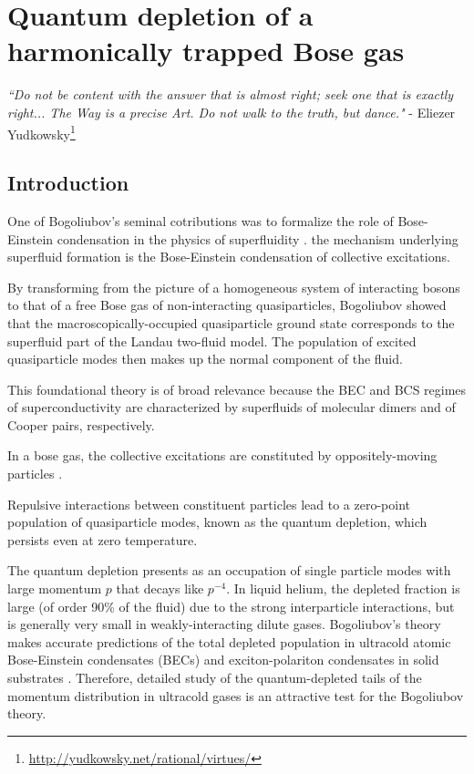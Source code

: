 \chapter{Quantum depletion of a harmonically trapped Bose gas}
\label{chap:QD}

\begin{adjustwidth}{3cm}{0cm}
\begin{flushright}
\emph{``Do not be content with the answer that is almost right; seek one that is exactly right...
	The Way is a precise Art.
	Do not walk to the truth, but dance."} - Eliezer Yudkowsky\footnote{\url{http://yudkowsky.net/rational/virtues/}}
\end{flushright}
\end{adjustwidth}


\section{Introduction} 
	One of Bogoliubov's seminal cotributions was to formalize the role of Bose-Einstein condensation in the physics of superfluidity \cite{Bogolubov47}.
	the mechanism underlying superfluid formation is the Bose-Einstein condensation of collective excitations.
	
	By transforming from the picture of a homogeneous system of interacting bosons to that of a free Bose gas of non-interacting quasiparticles, Bogoliubov showed that the macroscopically-occupied quasiparticle ground state corresponds to the superfluid part of the Landau two-fluid model.
	The population of excited quasiparticle modes then makes up the normal component of the fluid.
	
	This foundational theory is of broad relevance because the BEC and BCS regimes of superconductivity are characterized by superfluids of molecular dimers and of Cooper pairs, respectively.
	  

	In a bose gas, the collective excitations are constituted by oppositely-moving particles \cite{Vogels02}.
	
	Repulsive interactions between constituent particles lead to a zero-point population of quasiparticle modes, known as the quantum depletion, which persists even at zero temperature.
	
	The quantum depletion presents as an occupation of single particle modes with large momentum $p$ that decays like $p^{-4}$.
	In liquid helium, the depleted fraction is large (of order 90\% of the fluid) due to the strong interparticle interactions, but is generally very small in weakly-interacting dilute gases.
	Bogoliubov's theory makes accurate predictions of the total depleted population in ultracold atomic Bose-Einstein condensates (BECs) \cite{Xu06,Lopes17_depletion} and exciton-polariton condensates in solid substrates \cite{Pieczarka20}.
	Therefore, detailed study of the quantum-depleted tails of the momentum distribution in ultracold gases is an attractive test for the Bogoliubov theory.

